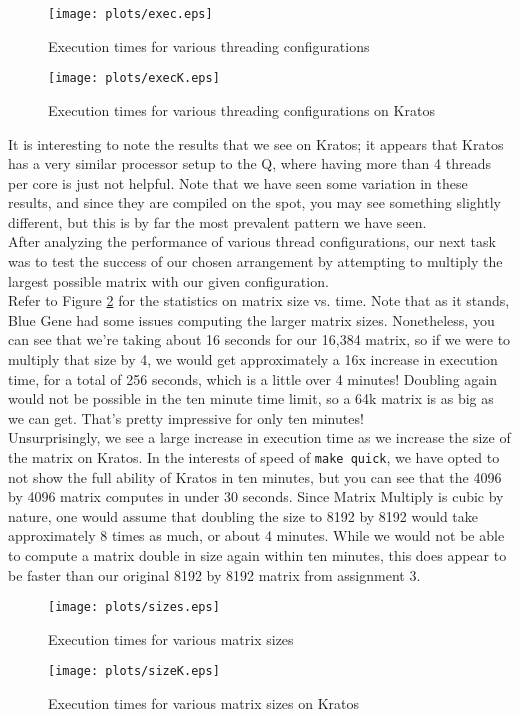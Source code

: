 \documentclass[twocolumn]{article}
\begin{document}
\begin{figure}[!ht]
  \centering
  \texttt{[image: plots/exec.eps]}
  \caption{Execution times for various threading configurations} \label{fig:exec}
\end{figure}

\begin{figure}[!ht]
  \centering
  \texttt{[image: plots/execK.eps]}
  \caption{Execution times for various threading configurations on Kratos} 
\end{figure}

It is interesting to note the results that we see on Kratos; it appears that Kratos
has a very similar processor setup to the Q, where having more than 4 threads per
core is just not helpful. Note that we have seen some variation in these results,
and since they are compiled on the spot, you may see something slightly different,
but this is by far the most prevalent pattern we have seen.\\

After analyzing the performance of various thread configurations, our next task
was to test the success of our chosen arrangement by attempting to multiply the
largest possible matrix with our given configuration. \\

Refer to Figure \ref{fig:time} for the statistics on matrix size vs. time. Note that
as it stands, Blue Gene had some issues computing the larger matrix sizes. 
Nonetheless, you can see that we're taking about 16 seconds for our 16,384 matrix,
so if we were to multiply that size by 4, we would get approximately a 16x increase 
in execution time, for a total of 256 seconds, which is a little over 4 minutes! 
Doubling again would not be possible in the ten minute time limit, so a 64k matrix
is as big as we can get. That's pretty impressive for only ten minutes! \\

Unsurprisingly, we see a large increase in execution time as we increase the size
of the matrix on Kratos. In the interests of speed of \texttt{make quick}, we have
opted to not show the full ability of Kratos in ten minutes, but you can see that 
the 4096 by 4096 matrix computes in under 30 seconds. Since Matrix Multiply is 
cubic by nature, one would assume that doubling the size to 8192 by 8192 would 
take approximately 8 times as much, or about 4 minutes. While we would not be able
to compute a matrix double in size again within ten minutes, this does appear to 
be faster than our original 8192 by 8192 matrix from assignment 3.

\begin{figure}
  \texttt{[image: plots/sizes.eps]}
  \caption{Execution times for various matrix sizes} \label{fig:time}
\end{figure}

\begin{figure}
  \texttt{[image: plots/sizeK.eps]}
  \caption{Execution times for various matrix sizes on Kratos}
\end{figure}
\end{document}

